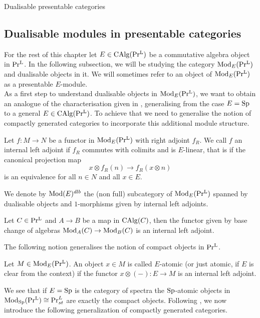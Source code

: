 \begin{subsection}{Dualisable presentable categories}
\subsection{Dualisable modules in presentable categories}
For the rest of this chapter let $E\in \operatorname{CAlg}(\operatorname{Pr^{L}})$ be a commutative algebra object in $\operatorname{Pr^{L}}$. In the following subsection, we will be studying the category $\operatorname{Mod}_E(\operatorname{Pr^{L}})$ and dualisable objects in it.  We will sometimes refer to an object of $\operatorname{Mod}_E(\operatorname{Pr^{L}})$ as a presentable $E$-module.\\

As a first step to understand dualisable objects in $\operatorname{Mod}_E(\operatorname{Pr^{L}})$, we want to obtain an analogue of the characterisation given in , generalising from the case $E=\operatorname{Sp}$ to a general $E\in \operatorname{CAlg}(\operatorname{Pr^{L}})$. To achieve that we need to generalise the notion of compactly generated categories to incorporate this additional module structure.
\begin{definition}\Cite[Definition 1.9]{ramzi2024dualizable}
    Let $f : M \to N$ be a functor in $\operatorname{Mod}_E(\operatorname{Pr^{L}})$ with right adjoint $f_R$. We call $f$ an internal left adjoint if $f_R$ commutes with colimits and is $E$-linear, that is if the canonical projection map 
    \[
    x \otimes f_R(n) \to f_R(x \otimes n)
    \]
is an equivalence for all $n\in N$ and all $x\in E$.
\end{definition}
We denote by $\operatorname{Mod}(E)^{dlb}$ the (non full) subcategory of $\operatorname{Mod}_E(\operatorname{Pr^{L}})$ spanned by dualisable objects and $1$-morphisms given by internal left adjoints. 
\begin{example}\Cite[Example 1.16]{ramzi2024dualizable}\label{examples of internal leftadjoint}
Let $C\in \operatorname{Pr^{L}}$ and $A \to B$ be a map in $\operatorname{CAlg}(C)$, then the functor given by base change of algebras  $\operatorname{Mod}_A(C)\to \operatorname{Mod}_B(C)$ is an internal left adjoint.
\end{example}

The following notion generalises the notion of compact objects in $\operatorname{Pr^{L}}$.
\begin{definition}\Cite[Definition 1.22]{ramzi2024dualizable}
 Let $M\in \operatorname{Mod}_E(\operatorname{Pr^{L}})$. An object $x\in M$ is called $E$-atomic (or just atomic, if $E$ is clear from the context) if the functor $x \otimes(-) :E \to M$ is an internal left adjoint.  
\end{definition}
We see that if $E=\operatorname{Sp}$ is the category of spectra the $\operatorname{Sp}$-atomic objects in $\operatorname{Mod}_{\operatorname{Sp}}(\operatorname{Pr^{L}})\cong \Pr_{st}^L$ are exactly the compact objects. Following \Cite{ramzi2024dualizable}, we now introduce the following generalization of compactly generated categories.


\end{subsection}
